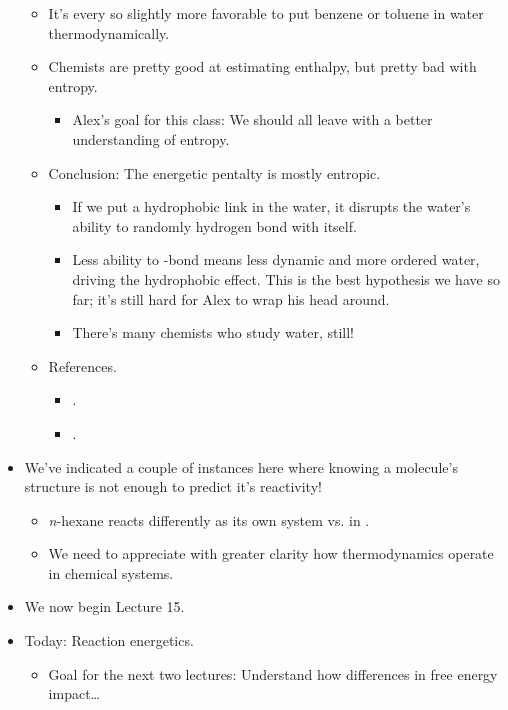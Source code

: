 \documentclass[../notes.tex]{subfiles}
\begin{document}
\begin{itemize}
\begin{itemize}
        \item It's every so slightly more favorable to put benzene or toluene in water thermodynamically.
        \item Chemists are pretty good at estimating enthalpy, but pretty bad with entropy.
        \begin{itemize}
            \item Alex's goal for this class: We should all leave with a better understanding of entropy.
        \end{itemize}
        \item Conclusion: The energetic pentalty is mostly entropic.
        \begin{itemize}
            \item If we put a hydrophobic link in the water, it disrupts the water's ability to randomly hydrogen bond with itself.
            \item Less ability to -bond means less dynamic and more ordered water, driving the hydrophobic effect. This is the best hypothesis we have so far; it's still hard for Alex to wrap his head around.
            \item There's many chemists who study water, still!
        \end{itemize}
        \item References.
        \begin{itemize}
            \item \textcite{bib:HydrophobicEffect1}.
            \item \textcite{bib:HydrophobicEffect2}.
        \end{itemize}
    \end{itemize}
    \item We've indicated a couple of instances here where knowing a molecule's structure is not enough to predict it's reactivity!
    \begin{itemize}
        \item \emph{n}-hexane reacts differently as its own system vs. in .
        \item We need to appreciate with greater clarity how thermodynamics operate in chemical systems.
    \end{itemize}
    \item We now begin Lecture 15.
    \item Today: Reaction energetics.
    \begin{itemize}
        \item Goal for the next two lectures: Understand how differences in free energy impact\dots

\end{itemize}
\end{itemize}
\end{document}
